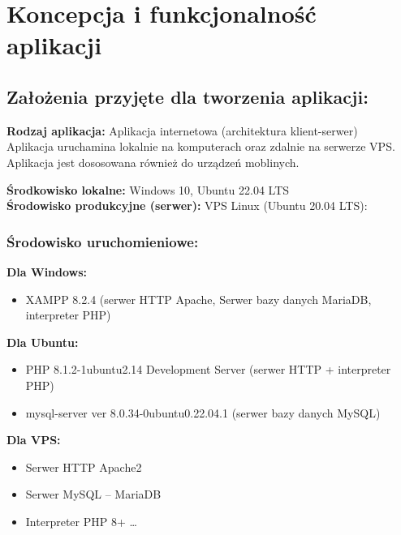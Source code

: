 \section{Koncepcja i funkcjonalność aplikacji}

\subsection{Założenia przyjęte dla tworzenia aplikacji:}
\begin{flushleft}

    \textbf{Rodzaj aplikacja:} Aplikacja internetowa (architektura klient-serwer) \\

    Aplikacja uruchamina lokalnie na komputerach oraz zdalnie na serwerze VPS. \\
    Aplikacja jest dososowana również do urządzeń moblinych. \newline\newline

    \textbf{Środkowisko lokalne:} Windows 10, Ubuntu 22.04 LTS \\
    \textbf{Środowisko produkcyjne (serwer):} VPS Linux (Ubuntu 20.04 LTS): \\ 

    \subsubsection{Środowisko uruchomieniowe:}

    \textbf{Dla Windows:}
    \begin{itemize}
        \item XAMPP 8.2.4 (serwer HTTP Apache, Serwer bazy danych MariaDB, interpreter PHP)
    \end{itemize}
        
    \textbf{Dla Ubuntu:}
    \begin{itemize}
        \item PHP 8.1.2-1ubuntu2.14 Development Server (serwer HTTP + interpreter PHP)
        \item mysql-server  ver 8.0.34-0ubuntu0.22.04.1 (serwer bazy danych MySQL)
    \end{itemize}

    \textbf{Dla VPS:}
    \begin{itemize}
        \item Serwer HTTP Apache2
        \item Serwer MySQL – MariaDB
        \item Interpreter PHP 8+ \ldots
    \end{itemize}
    
\end{flushleft}

